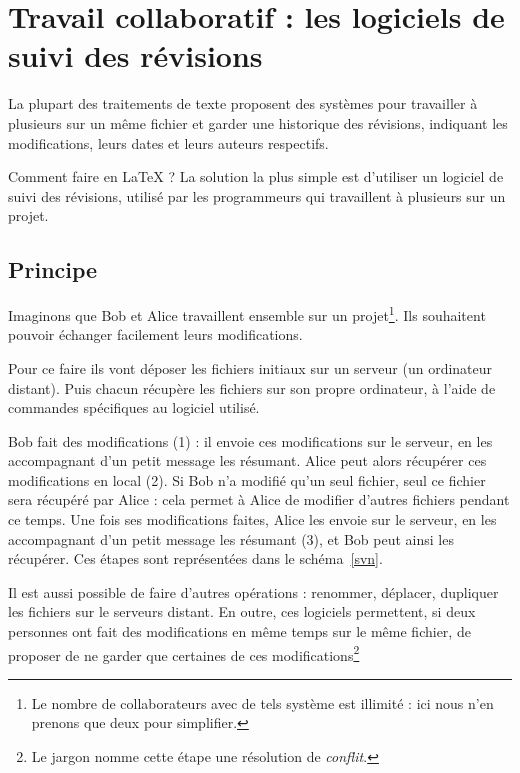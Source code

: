 \chapter{Travail collaboratif : les logiciels de suivi des révisions}\label{principesvn}    %

\begin{prealable}
    La plupart des traitements de texte proposent des systèmes pour travailler à plusieurs sur un même fichier et garder une historique des révisions, indiquant les modifications, leurs dates et leurs auteurs respectifs. 
    
    Comment faire en \LaTeX{} ? La solution la plus simple est d'utiliser un logiciel de suivi des révisions, utilisé par les programmeurs qui travaillent à plusieurs sur un projet.
\end{prealable}

\section{Principe}
Imaginons que Bob et Alice travaillent ensemble sur un projet\footnote{Le nombre de collaborateurs avec de tels système est illimité : ici nous n'en prenons que deux pour simplifier.}. Ils souhaitent pouvoir échanger facilement leurs modifications.

Pour ce faire ils vont déposer les fichiers initiaux sur un serveur (un ordinateur distant). Puis chacun récupère les fichiers sur son propre ordinateur, à l'aide de commandes spécifiques au logiciel utilisé.

Bob fait des modifications (1) : il envoie ces modifications sur le serveur, en les accompagnant d'un petit message les résumant. Alice peut alors récupérer ces modifications en local (2). Si Bob n'a modifié qu'un seul fichier, seul ce fichier sera récupéré par Alice : cela permet à Alice de modifier d'autres fichiers pendant ce temps. Une fois ses modifications faites, Alice les envoie sur le serveur, en les accompagnant d'un petit message les résumant (3), et Bob peut ainsi les récupérer. Ces étapes sont représentées dans le schéma~\ref{svn}. 

Il est aussi possible de faire d'autres opérations : renommer, déplacer, dupliquer les fichiers sur le serveurs distant. En outre, ces logiciels permettent, si deux personnes ont fait des modifications en même temps sur le même fichier, de proposer de ne garder que certaines de ces modifications\footnote{Le jargon nomme cette étape une résolution de \emph{conflit}.}

